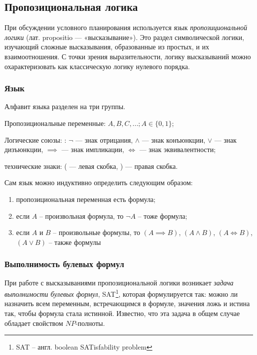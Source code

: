 \subsection{Пропозициональная логика}

При обсуждении условного планирования используется язык \emph{пропозицио\-нальной логики} (лат. propositio --- «высказывание»). Это раздел символической логики,
изучающий сложные высказывания, образованные из простых, и их
взаимоотношения. С точки зрения выразительности, логику высказываний
можно охарактеризовать как классическую логику нулевого порядка.

\subsubsection{Язык}

Алфавит языка разделен на три группы.

\begin{itemize*}
\item
  Пропозициональные переменные: $A, B, C, ...; A \in \{0, 1\}$;
\item
  Логические союзы: : $\neg$ --- знак отрицания, $\land$ --- знак
  конъюнкции, $\lor$ --- знак дизъюнкции, $\implies$ --- знак
  импликации, $\iff$ --- знак эквивалентности;
\item
  технические знаки: ( --- левая скобка, ) --- правая скобка.
\end{itemize*}

Сам язык можно индуктивно определить следующим образом:
\begin{enumerate}
 \item пропозициональная переменная есть формула;
 \item если $A$ -- произвольная формула, то $\neg A$ -- тоже формула;
 \item если $A$ и $B$ -- произвольные формулы, то $(A \implies B)$, $(A \land B)$, $(A \iff B)$, $(A \lor B)$ -- также формулы
\end{enumerate}

\subsubsection{Выполнимость булевых формул}

При работе с высказываниями пропозициональной логики возникает
\emph{задача выполнимости булевых формул}, SAT\footnote{SAT -- англ. boolean SATisfability problem}, которая формулируется так:
можно ли назначить всем переменным, встречающимся в формуле, значения
ложь и истина так, чтобы формула стала истинной. Известно, что эта
задача в общем случае обладает свойством $NP$-полноты.

